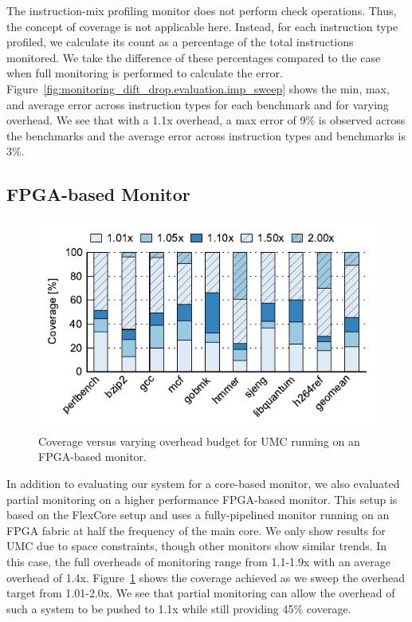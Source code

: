 The instruction-mix profiling monitor does not perform check operations. Thus,
the concept of coverage is not applicable here. Instead, for each instruction
type profiled, we calculate its count as a percentage of the total instructions
monitored. We take the difference of these percentages compared to the case
when full monitoring is performed to calculate the error.
Figure~\ref{fig:monitoring_dift_drop.evaluation.imp_sweep} shows the min, max,
and average error across instruction types for each benchmark and for varying
overhead. We see that with a 1.1x overhead, a max error of 9\% is observed
across the benchmarks and the average error across instruction types and
benchmarks is 3\%. 

\subsection{FPGA-based Monitor}
\label{sec:monitoring_dift_drop.evaluation.fpga}

\begin{figure}
  \begin{center}
    \includegraphics{monitoring_dift_drop/data/fpga_umc_sweep.pdf}
    \caption{Coverage versus varying overhead budget for UMC running on an FPGA-based monitor.}
    \label{fig:monitoring_dift_drop.evaluation.fpga_umc_sweep}
  \end{center}
\end{figure}

In addition to evaluating our system for a core-based monitor, we also
evaluated partial monitoring on a higher performance FPGA-based monitor. This
setup is based on the FlexCore \cite{flexcore-micro10} setup and uses a
fully-pipelined monitor running on an FPGA fabric at half the frequency of the
main core. We only show results for UMC due to space constraints, though other
monitors show similar trends. In this case, the full overheads of monitoring
range from 1.1-1.9x with an average overhead of 1.4x.
Figure~\ref{fig:monitoring_dift_drop.evaluation.fpga_umc_sweep} shows the
coverage achieved as we sweep the overhead target from 1.01-2.0x. We see that
partial monitoring can allow the overhead of such a system to be pushed to 1.1x
while still providing 45\% coverage.

